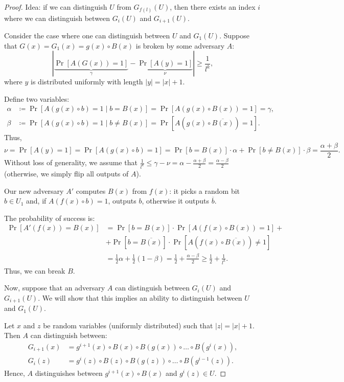 \begin{proof}
  Idea: if we can distinguish $U$ from $G_{f(l)}(U)$, then there exists an index $i$ where we can distinguish between $G_i(U)$ and $G_{i + 1}(U)$.

  Consider the case where one can distinguish between $U$ and $G_{1}(U)$.
  Suppose that $G(x) = G_1(x) = g(x) \circ B(x)$ is broken by some adversary $A$:
   \[
	   \left| \underbrace{\Pr[A(G(x)) = 1]}_{\gamma} - \underbrace{\Pr[A(y) = 1]}_{\nu} \right| \ge \frac{1}{l^{k}}
  ,\] 
  where $y$ is distributed uniformly with length $|y| = |x| + 1$.
  
  Define two variables:
   \begin{align*}
	   \alpha &\coloneqq \Pr[A(g(x) \circ b) = 1  \mid b = B(x)] = \Pr[A(g(x) \circ B(x)) = 1] = \gamma,\\
	   \beta &\coloneqq \Pr[A(g(x) \circ b) = 1  \mid b \neq  B(x)] = \Pr[A(g(x) \circ \overline{B(x)}) = 1].
   \end{align*}
  Thus,
  \[
	  \nu = \Pr[A(y) = 1] = \Pr[A(g(x) \circ b) = 1] = \Pr[b = B(x)] \cdot \alpha + \Pr[b \neq B(x)] \cdot \beta = \frac{\alpha + \beta}{2}.
  \] 
  Without loss of generality, we assume that $\frac{1}{l^{k}} \le \gamma - \nu = \alpha - \frac{\alpha + \beta}{2} = \frac{\alpha - \beta}{2}$ (otherwise, we simply flip all outputs of $A$).
  
  Our new adversary $A'$ computes $B(x)$ from $f(x)$: it picks a random bit $b \in U_1$ and, if $A(f(x) \circ b) = 1$, outputs $b$, otherwise it outputs $\overline{b}$.
  
  The probability of success is:
  \begin{align*}
	  \Pr[A'(f(x)) = B(x)] &= \Pr[b = B(x)] \cdot \Pr[A(f(x) \circ B(x)) = 1] + \\
						   &+ \Pr[b = \overline{B(x)}] \cdot \Pr[A(f(x) \circ \overline{B(x)}) \neq 1] \\
						   &= \frac{1}{2} \alpha + \frac{1}{2} (1 - \beta) = \frac{1}{2} + \frac{\alpha - \beta}{2} \ge  \frac{1}{2} + \frac{1}{l^{k}}.
  \end{align*}
  Thus, we can break $B$.

  Now, suppose that an adversary $A$ can distinguish between $G_i(U)$ and $G_{i + 1}(U)$.
  We will show that this implies an ability to distinguish between $U$ and $G_1(U)$.
  
  Let $x$ and $z$ be random variables (uniformly distributed) such that $|z| = |x| + 1$.
  Then $A$ can distinguish between:
   \begin{align*}
	   G_{i + 1}(x) &= g^{i + 1}(x) \circ B(x) \circ B(g(x)) \circ \dots \circ B(g^{i}(x)),\\
	   G_{i}(z) &= g^{i}(z) \circ B(z) \circ B(g(z)) \circ \dots \circ B(g^{i - 1}(z)).
   \end{align*}
  Hence, $A$ distinguishes between $g^{i + 1}(x) \circ B(x)$ and $g^{i}(z) \in U$.
\end{proof}
